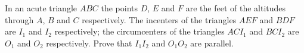 In an acute triangle $ABC$ the points $D$, $E$ and $F$ are the feet of the altitudes through $A$, $B$ and $C$ respectively. The incenters of the triangles $AEF$ and $BDF$ are $I_1$ and $I_2$ respectively; the circumcenters of the triangles $ACI_1$ and $BCI_2$ are $O_1$ and $O_2$ respectively. Prove that $I_1 I_2$ and $O_1 O_2$ are parallel.
